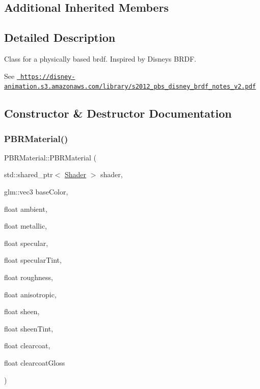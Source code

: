\subsection*{Additional Inherited Members}


\subsection{Detailed Description}
Class for a physically based brdf. Inspired by Disney\textquotesingle{}s B\+R\+DF. 

See \href{https://disney-animation.s3.amazonaws.com/library/s2012_pbs_disney_brdf_notes_v2.pdf}{\texttt{ https\+://disney-\/animation.\+s3.\+amazonaws.\+com/library/s2012\+\_\+pbs\+\_\+disney\+\_\+brdf\+\_\+notes\+\_\+v2.\+pdf}} 

\subsection{Constructor \& Destructor Documentation}
\mbox{\label{class_p_b_r_material_a7d68d63ef74715518d63041336b2a684}} 
\subsubsection{\texorpdfstring{PBRMaterial()}{PBRMaterial()}\hspace{0.1cm}{\footnotesize\ttfamily [1/3]}}
{\footnotesize\ttfamily P\+B\+R\+Material\+::\+P\+B\+R\+Material (\begin{DoxyParamCaption}\item[{std\+::shared\+\_\+ptr$<$ \mbox{\hyperlink{class_shader}{Shader}} $>$}]{shader,  }\item[{glm\+::vec3}]{base\+Color,  }\item[{float}]{ambient,  }\item[{float}]{metallic,  }\item[{float}]{specular,  }\item[{float}]{specular\+Tint,  }\item[{float}]{roughness,  }\item[{float}]{anisotropic,  }\item[{float}]{sheen,  }\item[{float}]{sheen\+Tint,  }\item[{float}]{clearcoat,  }\item[{float}]{clearcoat\+Gloss }\end{DoxyParamCaption})}

